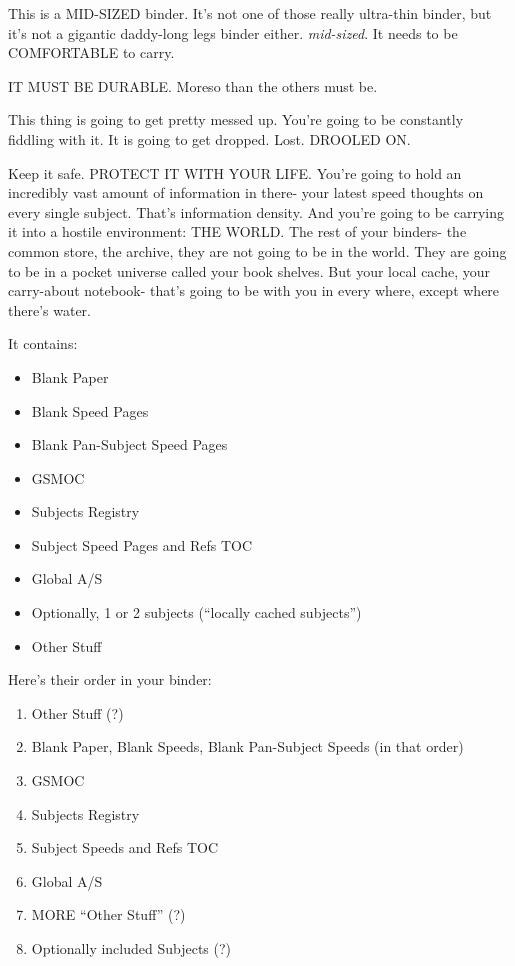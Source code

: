 \documentclass[oneside]{book}
\begin{document}
This is a MID-SIZED binder. It's not one of those really ultra-thin
binder, but it's not a gigantic daddy-long legs binder
either. \emph{mid-sized}. It needs to be COMFORTABLE to carry.

IT MUST BE DURABLE. Moreso than the others must be.

This thing is going to get pretty messed up. You're going to be
constantly fiddling with it. It is going to get dropped. Lost. DROOLED
ON.

Keep it safe. PROTECT IT WITH YOUR LIFE. You're going to hold an
incredibly vast amount of information in there- your latest speed
thoughts on every single subject. That's information density. And
you're going to be carrying it into a hostile environment: THE
WORLD. The rest of your binders- the common store, the archive, they
are not going to be in the world. They are going to be in a pocket
universe called your book shelves. But your local cache, your
carry-about notebook- that's going to be with you in every where,
except where there's water.

It contains:

\begin{itemize}
\item Blank Paper
\item Blank Speed Pages
\item Blank Pan-Subject Speed Pages
\item GSMOC
\item Subjects Registry
\item Subject Speed Pages and Refs TOC
\item Global A/S
\item Optionally, 1 or 2 subjects (``locally cached subjects'')
\item Other Stuff
\end{itemize}

Here's their order in your binder:

\begin{enumerate}
\item Other Stuff (?)
\item Blank Paper, Blank Speeds, Blank Pan-Subject Speeds (in that order)
\item GSMOC
\item Subjects Registry
\item Subject Speeds and Refs TOC
\item Global A/S
\item MORE ``Other Stuff'' (?)
\item Optionally included Subjects (?)
\end{enumerate}
\end{document}
